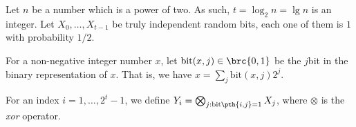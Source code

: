 Let $n$ be a number which is a power of two. As such,
$t = \log_2 n = \lg n$ is an integer.  Let $X_0, \ldots, X_{t-1}$ be truly
independent random bits, each one of them is $1$ with probability
$1/2$.

For a non-negative integer number $x$, let
$\mathrm{bit}(x,j) \in \brc{0,1}$ be the $j$\th bit in the binary
representation of $x$. That is, we have
$x = \sum_{j} \mathrm{bit}(x,j)2^j$.

\newcommand{\bitY}[2]{\mathrm{bit}\pth{#1,#2}}%

For an index $i=1,\ldots, 2^{t}-1$, we define
$Y_i = \bigotimes_{j: \bitY{i}{j} = 1} X_j$, where $\otimes$ is the
\emph{xor} operator.

